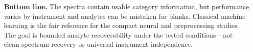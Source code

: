\documentclass[10pt]{article}
\begin{document}
\textbf{Bottom line.} The spectra contain usable category information, but performance varies by instrument and analytes can be mistaken for blanks. Classical machine learning is the fair reference for the compact neural and preprocessing studies. The goal is bounded analyte recoverability under the tested conditions---not clean-spectrum recovery or universal instrument independence.
\end{document}
